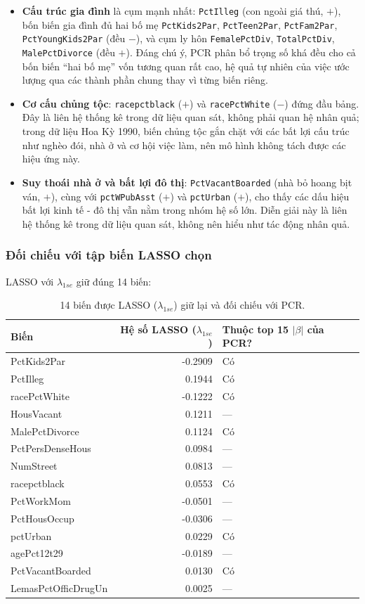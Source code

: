 \begin{itemize}
\tightlist
\item
  \textbf{Cấu trúc gia đình} là cụm mạnh nhất: \texttt{PctIlleg} (con
  ngoài giá thú, \(+\)), bốn biến gia đình đủ hai bố mẹ
  \texttt{PctKids2Par}, \texttt{PctTeen2Par}, \texttt{PctFam2Par},
  \texttt{PctYoungKids2Par} (đều \(-\)), và cụm ly hôn
  \texttt{FemalePctDiv}, \texttt{TotalPctDiv}, \texttt{MalePctDivorce}
  (đều \(+\)). Đáng chú ý, PCR phân bổ trọng số khá đều cho cả bốn biến
  ``hai bố mẹ'' vốn tương quan rất cao, hệ quả tự nhiên của việc ước
  lượng qua các thành phần chung thay vì từng biến riêng.
\item
  \textbf{Cơ cấu chủng tộc}: \texttt{racepctblack} (\(+\)) và
  \texttt{racePctWhite} (\(-\)) đứng đầu bảng. Đây là liên hệ thống kê
  trong dữ liệu quan sát, không phải quan hệ nhân quả; trong dữ liệu Hoa
  Kỳ 1990, biến chủng tộc gắn chặt với các bất lợi cấu trúc như nghèo
  đói, nhà ở và cơ hội việc làm, nên mô hình không tách được các hiệu
  ứng này.
\item
  \textbf{Suy thoái nhà ở và bất lợi đô thị}: \texttt{PctVacantBoarded}
  (nhà bỏ hoang bịt ván, \(+\)), cùng với \texttt{pctWPubAsst} (\(+\))
  và \texttt{pctUrban} (\(+\)), cho thấy các dấu hiệu bất lợi kinh tế -
  đô thị vẫn nằm trong nhóm hệ số lớn. Diễn giải này là liên hệ thống kê
  trong dữ liệu quan sát, không nên hiểu như tác động nhân quả.
\end{itemize}

\subsubsection{Đối chiếu với tập biến LASSO
chọn}\label{ux111ux1ed1i-chiux1ebfu-vux1edbi-tux1eadp-biux1ebfn-lasso-chux1ecdn}

LASSO với \(\lambda_{1se}\) giữ đúng 14 biến:

\begin{longtable}[t]{lrl}
\caption{\label{tab:lasso-compare}14 biến được LASSO ($\lambda_{1se}$) giữ lại và đối chiếu với PCR.}\\
\toprule
Biến & Hệ số LASSO ($\lambda_{1se}$) & Thuộc top 15 $|\beta|$ của PCR?\\
\midrule
PctKids2Par & -0.2909 & Có\\
PctIlleg & 0.1944 & Có\\
racePctWhite & -0.1222 & Có\\
HousVacant & 0.1211 & —\\
MalePctDivorce & 0.1124 & Có\\
\addlinespace
PctPersDenseHous & 0.0984 & —\\
NumStreet & 0.0813 & —\\
racepctblack & 0.0553 & Có\\
PctWorkMom & -0.0501 & —\\
PctHousOccup & -0.0306 & —\\
\addlinespace
pctUrban & 0.0229 & Có\\
agePct12t29 & -0.0189 & —\\
PctVacantBoarded & 0.0130 & Có\\
LemasPctOfficDrugUn & 0.0025 & —\\
\bottomrule
\end{longtable}

